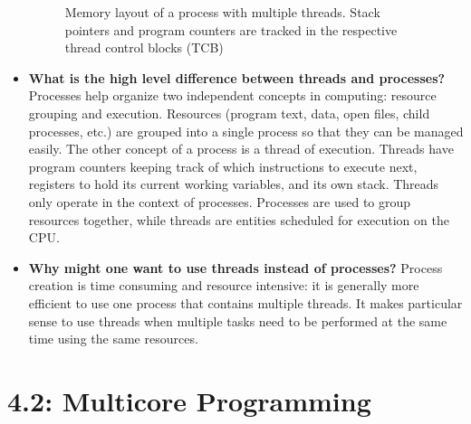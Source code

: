 \documentclass[12pt]{article}
\begin{document}
\begin{itemize}
\begin{figure}[ht]
            \caption{Memory layout of a process with multiple threads. Stack pointers and program counters are tracked in the respective thread control blocks (TCB)}
            \label{fig:thread-memory-layout}
        \end{figure}
    \item \textbf{What is the high level difference between threads and processes?} Processes help organize two independent concepts in computing: resource grouping and execution. Resources (program text, data, open files, child processes, etc.) are grouped into a single process so that they can be managed easily. The other concept of a process is a thread of execution. Threads have program counters keeping track of which instructions to execute next, registers to hold its current working variables, and its own stack. Threads only operate in the context of processes. Processes are used to group resources together, while threads are entities scheduled for execution on the CPU.
    \item \textbf{Why might one want to use threads instead of processes?} Process creation is time consuming and resource intensive: it is generally more efficient to use one process that contains multiple threads. It makes particular sense to use threads when multiple tasks need to be performed at the same time using the same resources.
\end{itemize}

\section*{4.2: Multicore Programming}
\end{document}
